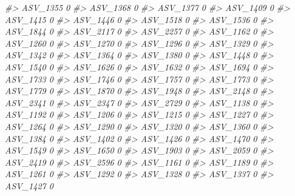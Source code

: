 \documentclass[
]{article}
\newenvironment{Shaded}{\begin{snugshade}}{\end{snugshade}}
\newcommand{\CommentTok}[1]{\textcolor[rgb]{0.56,0.35,0.01}{\textit{#1}}}
\begin{document}
\begin{Shaded}
\begin{Highlighting}[]
\CommentTok{\#\textgreater{} ASV\_1355  0}
\CommentTok{\#\textgreater{} ASV\_1368  0}
\CommentTok{\#\textgreater{} ASV\_1377  0}
\CommentTok{\#\textgreater{} ASV\_1409  0}
\CommentTok{\#\textgreater{} ASV\_1415  0}
\CommentTok{\#\textgreater{} ASV\_1446  0}
\CommentTok{\#\textgreater{} ASV\_1518  0}
\CommentTok{\#\textgreater{} ASV\_1536  0}
\CommentTok{\#\textgreater{} ASV\_1844  0}
\CommentTok{\#\textgreater{} ASV\_2117  0}
\CommentTok{\#\textgreater{} ASV\_2257  0}
\CommentTok{\#\textgreater{} ASV\_1162  0}
\CommentTok{\#\textgreater{} ASV\_1260  0}
\CommentTok{\#\textgreater{} ASV\_1270  0}
\CommentTok{\#\textgreater{} ASV\_1296  0}
\CommentTok{\#\textgreater{} ASV\_1329  0}
\CommentTok{\#\textgreater{} ASV\_1342  0}
\CommentTok{\#\textgreater{} ASV\_1364  0}
\CommentTok{\#\textgreater{} ASV\_1380  0}
\CommentTok{\#\textgreater{} ASV\_1448  0}
\CommentTok{\#\textgreater{} ASV\_1540  0}
\CommentTok{\#\textgreater{} ASV\_1626  0}
\CommentTok{\#\textgreater{} ASV\_1632  0}
\CommentTok{\#\textgreater{} ASV\_1694  0}
\CommentTok{\#\textgreater{} ASV\_1733  0}
\CommentTok{\#\textgreater{} ASV\_1746  0}
\CommentTok{\#\textgreater{} ASV\_1757  0}
\CommentTok{\#\textgreater{} ASV\_1773  0}
\CommentTok{\#\textgreater{} ASV\_1779  0}
\CommentTok{\#\textgreater{} ASV\_1870  0}
\CommentTok{\#\textgreater{} ASV\_1948  0}
\CommentTok{\#\textgreater{} ASV\_2148  0}
\CommentTok{\#\textgreater{} ASV\_2341  0}
\CommentTok{\#\textgreater{} ASV\_2347  0}
\CommentTok{\#\textgreater{} ASV\_2729  0}
\CommentTok{\#\textgreater{} ASV\_1138  0}
\CommentTok{\#\textgreater{} ASV\_1192  0}
\CommentTok{\#\textgreater{} ASV\_1206  0}
\CommentTok{\#\textgreater{} ASV\_1215  0}
\CommentTok{\#\textgreater{} ASV\_1227  0}
\CommentTok{\#\textgreater{} ASV\_1264  0}
\CommentTok{\#\textgreater{} ASV\_1290  0}
\CommentTok{\#\textgreater{} ASV\_1320  0}
\CommentTok{\#\textgreater{} ASV\_1360  0}
\CommentTok{\#\textgreater{} ASV\_1384  0}
\CommentTok{\#\textgreater{} ASV\_1402  0}
\CommentTok{\#\textgreater{} ASV\_1426  0}
\CommentTok{\#\textgreater{} ASV\_1470  0}
\CommentTok{\#\textgreater{} ASV\_1549  0}
\CommentTok{\#\textgreater{} ASV\_1650  0}
\CommentTok{\#\textgreater{} ASV\_1903  0}
\CommentTok{\#\textgreater{} ASV\_2059  0}
\CommentTok{\#\textgreater{} ASV\_2419  0}
\CommentTok{\#\textgreater{} ASV\_2596  0}
\CommentTok{\#\textgreater{} ASV\_1161  0}
\CommentTok{\#\textgreater{} ASV\_1189  0}
\CommentTok{\#\textgreater{} ASV\_1261  0}
\CommentTok{\#\textgreater{} ASV\_1292  0}
\CommentTok{\#\textgreater{} ASV\_1328  0}
\CommentTok{\#\textgreater{} ASV\_1337  0}
\CommentTok{\#\textgreater{} ASV\_1427  0}

\end{Highlighting}
\end{Shaded}
\end{document}
